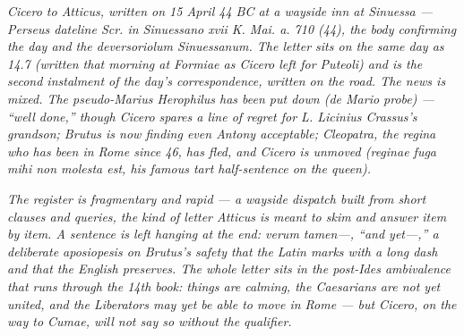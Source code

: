 
\textit{Cicero to Atticus, written on 15 April 44 BC at a wayside
inn at Sinuessa --- Perseus dateline \textit{Scr. in Sinuessano
xvii K. Mai. a. 710 (44)}, the body confirming the day and the
\textit{deversoriolum Sinuessanum}. The letter sits on the same
day as 14.7 (written that morning at Formiae as Cicero left for
Puteoli) and is the second instalment of the day's
correspondence, written on the road. The news is mixed. The
pseudo-Marius Herophilus has been put down (\textit{de Mario
probe}) --- ``well done,'' though Cicero spares a line of regret
for L. Licinius Crassus's grandson; Brutus is now finding even
Antony acceptable; Cleopatra, the \textit{regina} who has been
in Rome since 46, has fled, and Cicero is unmoved
(\textit{reginae fuga mihi non molesta est}, his famous tart
half-sentence on the queen).}

\textit{The register is fragmentary and rapid --- a wayside
dispatch built from short clauses and queries, the kind of
letter Atticus is meant to skim and answer item by item. A
sentence is left hanging at the end: \textit{verum tamen---},
``and yet---,'' a deliberate aposiopesis on Brutus's safety
that the Latin marks with a long dash and that the English
preserves. The whole letter sits in the post-Ides ambivalence
that runs through the 14th book: things are calming, the
Caesarians are not yet united, and the Liberators may yet be
able to move in Rome --- but Cicero, on the way to Cumae, will
not say so without the qualifier.}
